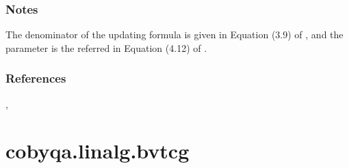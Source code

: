 \documentclass[letterpaper,10pt,english]{sphinxmanual}
\begin{document}
\begin{fulllineitems}
\subsubsection*{Notes}

\sphinxAtStartPar
The denominator of the updating formula is given in Equation (3.9) of
, and the parameter  is the referred in Equation (4.12) of
.
\subsubsection*{References}

\sphinxAtStartPar
{}, 

\end{fulllineitems}



\section{cobyqa.linalg.bvtcg}
\label{\detokenize{refs/generated/cobyqa.linalg.bvtcg:cobyqa-linalg-bvtcg}}\label{\detokenize{refs/generated/cobyqa.linalg.bvtcg::doc}}
\end{document}
